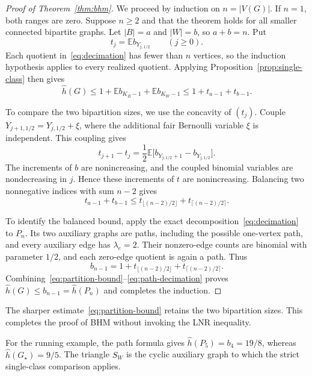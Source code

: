 \documentclass[11pt,reqno]{amsart}
\theoremstyle{remark}
\numberwithin{equation}{section}
\newcommand{\E}{\mathbb E}
\begin{document}
\begin{proof}[Proof of Theorem~\ref{thm:bhm}]
We proceed by induction on $n=|V(G)|$. If $n=1$, both ranges are zero.
Suppose
$n\ge2$ and that the theorem holds for all smaller connected bipartite
graphs. Let $|B|=a$ and $|W|=b$, so $a+b=n$. Put
\[
 t_j=\E b_{Y_{j,1/2}}\qquad(j\ge0).
\]
Each quotient in~\eqref{eq:decimation} has fewer than $n$ vertices, so
the induction hypothesis applies to every realized quotient. Applying
Proposition~\ref{prop:single-class} then gives
\begin{equation}\label{eq:partition-bound}
 \widehat h(G)
 \le1+\E b_{K_B-1}+\E b_{K_W-1}
 \le1+t_{a-1}+t_{b-1}.
\end{equation}

To compare the two bipartition sizes, we use the concavity of $(t_j)$.
Couple $Y_{j+1,1/2}=Y_{j,1/2}+\xi$, where the additional fair Bernoulli
variable $\xi$ is independent. This coupling gives
\[
 t_{j+1}-t_j
   =\frac12\E\bigl[b_{Y_{j,1/2}+1}-b_{Y_{j,1/2}}\bigr].
\]
The increments of $b$ are nonincreasing, and the coupled binomial
variables are nondecreasing in $j$. Hence these increments of $t$ are
nonincreasing. Balancing two nonnegative indices with sum $n-2$ gives
\begin{equation}\label{eq:balance}
 t_{a-1}+t_{b-1}
 \le t_{\lfloor(n-2)/2\rfloor}+t_{\lceil(n-2)/2\rceil}.
\end{equation}

To identify the balanced bound, apply the exact
decomposition~\eqref{eq:decimation} to $P_n$.
Its two auxiliary graphs are paths, including the possible one-vertex
path, and every auxiliary edge has $\lambda_e=2$. Their nonzero-edge
counts are binomial with parameter $1/2$, and each zero-edge quotient
is again a path. Thus
\begin{equation}\label{eq:path-decimation}
 b_{n-1}=1+t_{\lfloor(n-2)/2\rfloor}
           +t_{\lceil(n-2)/2\rceil}.
\end{equation}
Combining~\eqref{eq:partition-bound}--\eqref{eq:path-decimation} proves
$\widehat h(G)\le b_{n-1}=\widehat h(P_n)$ and completes the induction.
\end{proof}

The sharper estimate~\eqref{eq:partition-bound} retains the two
bipartition sizes. This completes the proof of BHM without invoking
the LNR inequality.

For the running example, the path formula gives
$\widehat h(P_5)=b_4=19/8$, whereas $\widehat h(G_\star)=9/5$.
The triangle $S_W$ is the cyclic auxiliary graph to which the strict
single-class comparison applies.
\end{document}
